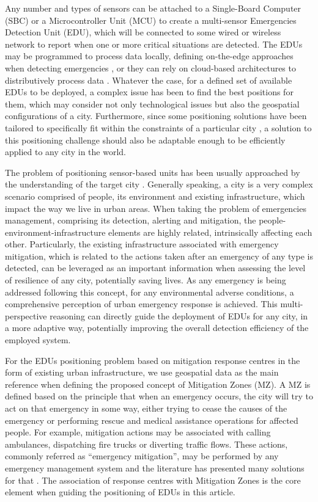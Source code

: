 \begin{refsection}
Any number and types of sensors can be attached to a Single-Board Computer (SBC) or a Microcontroller Unit (MCU) to create a multi-sensor Emergencies Detection Unit (EDU), which will be connected to some wired or wireless network to report when one or more critical situations are detected. The EDUs may be programmed to process data locally, defining on-the-edge approaches when detecting emergencies \cite{smartcitiesedge}, or they can rely on cloud-based architectures to distributively process data \cite{smarticiteshibrid}. Whatever the case, for a defined set of available EDUs to be deployed, a complex issue has been to find the best positions for them, which may consider not only technological issues but also the geospatial configurations of a city. Furthermore, since some positioning solutions have been tailored to specifically fit within the constraints of a particular city \cite{positions1,positions2}, a solution to this positioning challenge should also be adaptable enough to be efficiently applied to any city in the world. 

The problem of positioning sensor-based units has been usually approached by the understanding of the target city \cite{spatial2}. Generally speaking, a city is a very complex scenario comprised of people, its environment and existing infrastructure, which impact the way we live in urban areas. When taking the problem of emergencies management, comprising its detection, alerting and mitigation, the people-environment-infrastructure elements are highly related, intrinsically affecting each other. Particularly, the existing infrastructure associated with emergency mitigation, which is related to the actions taken after an emergency of any type is detected, can be leveraged as an important information when assessing the level of resilience of any city, potentially saving lives. As any emergency is being addressed following this concept, for any environmental adverse conditions, a comprehensive perception of urban emergency response is achieved. This multi-perspective reasoning can directly guide the deployment of EDUs for any city, in a more adaptive way, potentially improving the overall detection efficiency of the employed system.

For the EDUs positioning problem based on mitigation response centres in the form of existing urban infrastructure, we use geospatial data as the main reference when defining the proposed concept of Mitigation Zones (MZ). A MZ is defined based on the principle that when an emergency occurs, the city will try to act on that emergency in some way, either trying to cease the causes of the emergency or performing rescue and medical assistance operations for affected people. For example, mitigation actions may be associated with calling ambulances, dispatching fire trucks or diverting traffic flows. These actions, commonly referred as ``emergency mitigation'', may be performed by any emergency management system and the literature has presented many solutions for that \cite{surveyEmergencies,mitigation1,mitigation2}. The association of response centres with Mitigation Zones is the core element when guiding the positioning of EDUs in this article.


\end{refsection}
